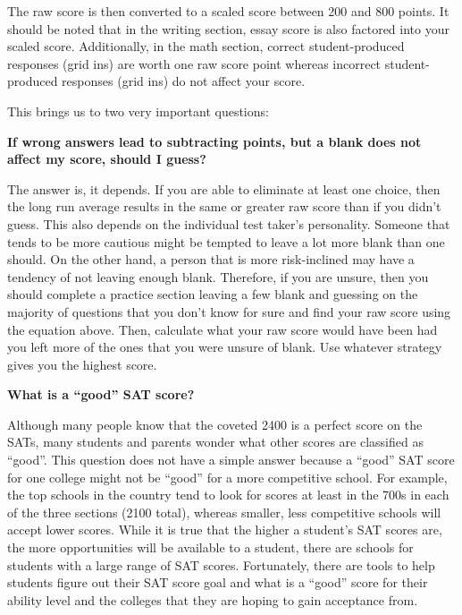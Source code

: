 \documentclass[12pt]{book}
\begin{document}
\bigskip
The raw score is then converted to a scaled score between 200 and 800 points. It should be noted that in the writing section, essay score is also factored into your scaled score. Additionally, in the math section, correct student-produced responses (grid ins) are worth one raw score point whereas incorrect student-produced responses (grid ins) do not affect your score.

\bigskip
This brings us to two very important questions:

\bigskip
\begin{inparaenum}[\bfseries1. ]
\item \textbf{If wrong answers lead to subtracting points, but a blank does not affect my score, should I guess?}

\bigskip
The answer is, it depends. If you are able to eliminate at least one choice, then the long run average results in the same or greater raw score than if you didn't guess. This also depends on the individual test taker's personality. Someone that tends to be more cautious might be tempted to leave a lot more blank than one should. On the other hand, a person that is more risk-inclined may have a tendency of not leaving enough blank. Therefore, if you are unsure, then you should complete a practice section leaving a few blank and guessing on the majority of questions that you don't know for sure and find your raw score using the equation above. Then, calculate what your raw score would have been had you left more of the ones that you were unsure of blank. Use whatever strategy gives you the highest score.


\bigskip
\item \textbf{What is a ``good'' SAT score?}
\end{inparaenum}

\bigskip
Although many people know that the coveted 2400 is a perfect score on the SATs, many students and parents wonder what other scores are classified as ``good''. This question does not have a simple answer because a ``good'' SAT score for one college might not be ``good'' for a more competitive school. For example, the top schools in the country tend to look for scores at least in the 700s in each of the three sections (2100 total), whereas smaller, less competitive schools will accept lower scores. While it is true that the higher a student's SAT scores are, the more opportunities will be available to a student, there are schools for students with a large range of SAT scores. Fortunately, there are tools to help students figure out their SAT score goal and what is a ``good'' score for their ability level and the colleges that they are hoping to gain acceptance from.
\end{document}
